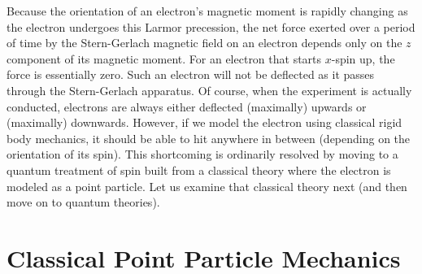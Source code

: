 \documentclass[12pt,secnumarabic,amsmath,amssymb,balancelastpage,nofootinbib]{article}
\begin{document}
Because the orientation of an electron's magnetic moment is rapidly changing as the electron undergoes this Larmor precession, the net force exerted over a period of time by the Stern-Gerlach magnetic field on an electron depends only on the $z$ component of its magnetic moment.  For an electron that starts $x$-spin up, the force is essentially zero.  Such an electron will not be deflected as it passes through the Stern-Gerlach apparatus.  Of course, when the experiment is actually conducted, electrons are always either deflected (maximally) upwards or (maximally) downwards.  However, if we model the electron using classical rigid body mechanics, it should be able to hit anywhere in between (depending on the orientation of its spin).  This shortcoming is ordinarily resolved by moving to a quantum treatment of spin built from a classical theory where the electron is modeled as a point particle.  Let us examine that classical theory next (and then move on to quantum theories).





\section{Classical Point Particle Mechanics}\label{pointparticlesection}
\end{document}
